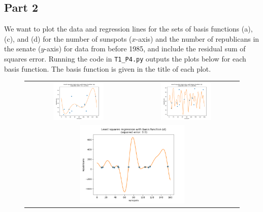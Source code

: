 \documentclass[submit]{harvardml}
\begin{document}
\newpage

\subsection{Part 2}
We want to plot the data and regression lines for the sets of basis functions (a), (c), and (d) for the number of sunspots ($x$-axis) and the number of republicans in the senate ($y$-axis) for data from before 1985, and include the residual sum of squares error.
Running the code in \verb+T1_P4.py+ outputs the plots below for each basis function. The basis function is given in the title of each plot.
\begin{figure}[h]
\begin{tabular}{cc}
    \includegraphics[width=0.5\textwidth]{4-2-a.png} & \includegraphics[width=0.5\textwidth]{4-2-c.png} \\
    \multicolumn{2}{c}{\includegraphics[width=0.5\textwidth]{4-2-d.png}}
\end{tabular}
\end{figure}
\end{document}
